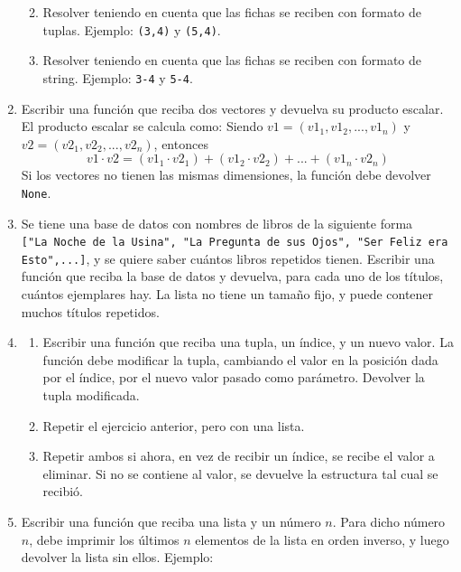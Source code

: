 \documentclass[
  letterpaper,
  DIV=11,
  numbers=noendperiod]{scrreprt}
\providecommand{\tightlist}{%
  \setlength{\itemsep}{0pt}\setlength{\parskip}{0pt}}\usepackage{longtable,booktabs,array}
\begin{document}
\begin{enumerate}
  \begin{enumerate}
  \def\labelenumii{\alph{enumii}.}
  \tightlist
  \item
    Resolver teniendo en cuenta que las fichas se reciben con formato de
    tuplas. Ejemplo: \texttt{(3,4)} y \texttt{(5,4)}.
  \item
    Resolver teniendo en cuenta que las fichas se reciben con formato de
    string. Ejemplo: \texttt{\textquotesingle{}3-4\textquotesingle{}} y
    \texttt{\textquotesingle{}5-4\textquotesingle{}}.
  \end{enumerate}
\item
  Escribir una función que reciba dos vectores y devuelva su producto
  escalar. El producto escalar se calcula como: Siendo
  \(v1 = (v1_1, v1_2, ..., v1_n)\) y \(v2 = (v2_1, v2_2, ..., v2_n)\),
  entonces\\
  \[v1 \cdot v2 = (v1_1 \cdot v2_1) + (v1_2 \cdot v2_2) + ... + (v1_n \cdot v2_n)\]
  Si los vectores no tienen las mismas dimensiones, la función debe
  devolver \texttt{None}.
\item
  Se tiene una base de datos con nombres de libros de la siguiente forma
  \texttt{{[}"La\ Noche\ de\ la\ Usina",\ "La\ Pregunta\ de\ sus\ Ojos",\ "Ser\ Feliz\ era\ Esto",...{]}},
  y se quiere saber cuántos libros repetidos tienen. Escribir una
  función que reciba la base de datos y devuelva, para cada uno de los
  títulos, cuántos ejemplares hay. La lista no tiene un tamaño fijo, y
  puede contener muchos títulos repetidos.
\item
  \begin{enumerate}
  \def\labelenumii{\alph{enumii}.}
  \item
    Escribir una función que reciba una tupla, un índice, y un nuevo
    valor. La función debe modificar la tupla, cambiando el valor en la
    posición dada por el índice, por el nuevo valor pasado como
    parámetro. Devolver la tupla modificada.
  \item
    Repetir el ejercicio anterior, pero con una lista.
  \item
    Repetir ambos si ahora, en vez de recibir un índice, se recibe el
    valor a eliminar. Si no se contiene al valor, se devuelve la
    estructura tal cual se recibió.
  \end{enumerate}
\item
  Escribir una función que reciba una lista y un número \(n\). Para
  dicho número \(n\), debe imprimir los últimos \(n\) elementos de la
  lista en orden inverso, y luego devolver la lista sin ellos. Ejemplo:

\end{enumerate}
\end{document}
